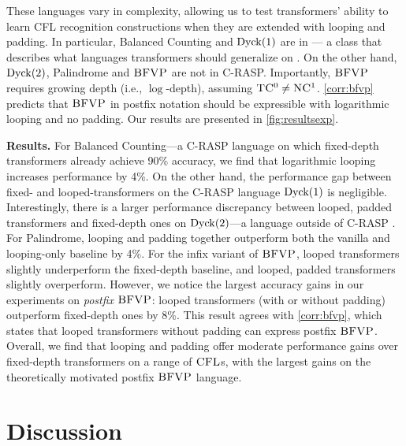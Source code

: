 \documentclass{article}
\begin{document}
These languages vary in complexity, allowing us to test transformers' ability to learn CFL recognition constructions when they are extended with looping and padding.
In particular, Balanced Counting and $\dyck{1}$ are in  --- a class that describes what languages transformers should generalize on \citep{yang2024countingliketransformerscompiling, huang2025a}.
On the other hand, $\dyck{2}$, Palindrome and ${\textsc{BFVP}}$ are not in C-RASP.
Importantly, ${\textsc{BFVP}}$ requires growing depth (i.e., $\log$-depth), assuming ${\textsc{TC}\textsuperscript{0}} \neq {\textsc{NC}\textsuperscript{1}}$.
\cref{corr:bfvp} predicts that ${\textsc{BFVP}}$ in postfix notation should be expressible with logarithmic looping and no padding.
Our results are presented in \cref{fig:resultsexp}.

\textbf{Results.}
For Balanced Counting---a C-RASP language on which fixed-depth transformers already achieve 90\% accuracy,
we find that logarithmic looping increases performance by 4\%.
On the other hand, the performance gap between fixed- and looped-transformers on the C-RASP language $\dyck{1}$ is negligible.
Interestingly, there is a larger performance discrepancy between looped, padded transformers and fixed-depth ones on $\dyck{2}$---a language outside of C-RASP \citep{hu-circuitschomskyprepretrainingformal}.
For Palindrome, looping and padding together outperform both the vanilla and looping-only baseline by 4\%. 
For the infix variant of ${\textsc{BFVP}}$, looped transformers slightly underperform the fixed-depth baseline, and looped, padded transformers slightly overperform.
However, we notice the largest accuracy gains in our experiments on \emph{postfix} ${\textsc{BFVP}}$: looped transformers (with or without padding) outperform fixed-depth ones by 8\%. 
This result agrees with \cref{corr:bfvp}, which states that looped transformers without padding can express postfix ${\textsc{BFVP}}$.
Overall, we find that looping and padding offer moderate performance gains over fixed-depth transformers on a range of ${\textsc{CFL}}$s, with the largest gains on the theoretically motivated postfix ${\textsc{BFVP}}$ language.


\section{Discussion}
\end{document}
